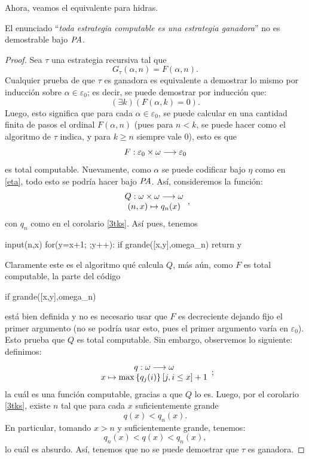 Ahora, veamos el equivalente para hidras.
\begin{thm}
    El enunciado ``\textit{toda estrategia computable es una estrategia ganadora}'' no es demostrable bajo $\textit{PA}$.
\end{thm}
\begin{proof}
    Sea $\tau$ una estrategia recursiva tal que 
    \[G_\tau(\alpha,n)=F(\alpha,n).\]
    Cualquier prueba de que $\tau$ es ganadora es equivalente a demostrar lo mismo por inducción sobre $\alpha\in\varepsilon_0$; es decir, se puede demostrar por inducción que:
    \[(\exists k)(F(\alpha,k)=0).\]
    Luego, esto significa que para cada $\alpha\in\varepsilon_0$, se puede calcular en una cantidad finita de pasos el ordinal $F(\alpha,n)$ (pues para $n<k$, se puede hacer como el algoritmo de $\tau$ indica, y para $k\geq n$ siempre vale 0), esto es que 
    \[F:\varepsilon_0\times\omega\longrightarrow\varepsilon_0\]
    es total computable. Nuevamente, como $\alpha$ se puede codificar bajo $\eta$ como en {\ref{eta}}, todo esto se podría hacer bajo $\textit{PA}$.
    Así, consideremos la función:
    \[\begin{array}{c}
        Q:\omega\times\omega\longrightarrow\omega\\
        (n,x)\mapsto q_n(x)
    \end{array},\]
    con $q_n$ como en el corolario {\ref{3tks}}. Así pues, tenemos
    \begin{center}
    \begin{pseudocodigo}
        input(n,x)
        for(y=x+1; ;y++):
            if grande([x,y],omega_n)
                return y
    \end{pseudocodigo}
    \end{center}
    Claramente este es el algoritmo qué calcula $Q$, más aún, como $F$ es total computable, la parte del código
    \begin{center}
    \begin{pseudocodigo}
        if grande([x,y],omega_n)
    \end{pseudocodigo}
    \end{center}
    está bien definida y no es necesario usar que $F$ es decreciente dejando fijo el primer argumento (no se podría usar esto, pues el primer argumento varía en $\varepsilon_0$). Esto prueba que $Q$ es total computable. Sin embargo, observemos lo siguiente: definimos:
    \[\begin{array}{c}
        q:\n\longrightarrow\n\\
        x\mapsto\max\set{q_j(i)}[j,i\leq x]+1
    \end{array};\]
    la cuál es una función computable, gracias a que $Q$ lo es.
    Luego, por el corolario {\ref{3tks}}, existe $n$ tal que para cada $x$ suficientemente grande
    \[q(x)<q_n(x).\]
    En particular, tomando $x>n$ y suficientemente grande, tenemos:
    \[q_n(x)<q(x)<q_n(x),\]
    lo cuál es absurdo. Así, tenemos que no se puede demostrar que $\tau$ es ganadora. 
\end{proof}